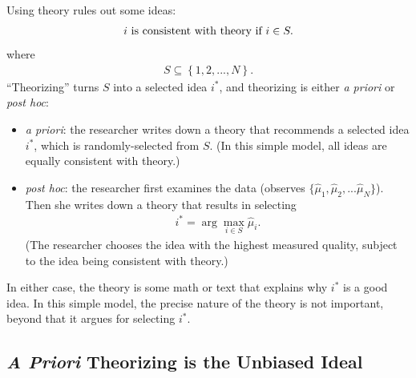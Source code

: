 \documentclass[12pt,english]{article}
\theoremstyle{plain}
\theoremstyle{plain}
\begin{document}
Using theory rules out some ideas:
\begin{align}
    \text{\ensuremath{i} is consistent with theory if }i\in S .
\end{align}
where
\begin{align}
    S \subseteq \left\{ 1,2,...,N\right\}
    \label{eq:ez:S}.
\end{align}
``Theorizing'' turns $S$ into a selected idea $i^\ast$, and theorizing is either \emph{a priori} or \emph{post hoc}: 
\begin{itemize}
\item \emph{a priori}: the researcher writes down a theory that recommends a selected idea $i^\ast$, which is randomly-selected from $S$. (In this simple model, all ideas are equally consistent with theory.)
\item \emph{post hoc}: the researcher first examines the data (observes $\{\hat{\mu}_1,\hat{\mu}_2,...\hat{\mu}_N\}$). Then she writes down a theory that results in selecting
\begin{align}
    i^\ast =  \arg\max_{i\in S }\hat{\mu}_{i}.\label{eq:given-ihat}
\end{align}
(The researcher chooses the idea with the highest measured quality, subject to the idea being consistent with theory.)
\end{itemize}
In either case, the theory is some math or text that explains why $i^\ast$ is a good idea. In this simple model, the precise nature of the theory is not important, beyond that it argues for selecting $i^\ast$. 


\subsection{\emph{A Priori} Theorizing is the Unbiased Ideal}
\end{document}
